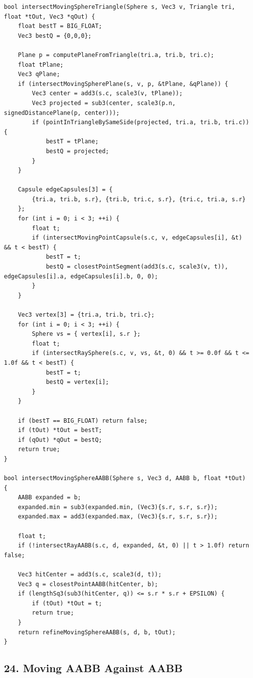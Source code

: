 \documentclass[10pt,letterpaper]{article}
\begin{document}
\begin{verbatim}
bool intersectMovingSphereTriangle(Sphere s, Vec3 v, Triangle tri, float *tOut, Vec3 *qOut) {
    float bestT = BIG_FLOAT;
    Vec3 bestQ = {0,0,0};

    Plane p = computePlaneFromTriangle(tri.a, tri.b, tri.c);
    float tPlane;
    Vec3 qPlane;
    if (intersectMovingSpherePlane(s, v, p, &tPlane, &qPlane)) {
        Vec3 center = add3(s.c, scale3(v, tPlane));
        Vec3 projected = sub3(center, scale3(p.n, signedDistancePlane(p, center)));
        if (pointInTriangleBySameSide(projected, tri.a, tri.b, tri.c)) {
            bestT = tPlane;
            bestQ = projected;
        }
    }

    Capsule edgeCapsules[3] = {
        {tri.a, tri.b, s.r}, {tri.b, tri.c, s.r}, {tri.c, tri.a, s.r}
    };
    for (int i = 0; i < 3; ++i) {
        float t;
        if (intersectMovingPointCapsule(s.c, v, edgeCapsules[i], &t) && t < bestT) {
            bestT = t;
            bestQ = closestPointSegment(add3(s.c, scale3(v, t)), edgeCapsules[i].a, edgeCapsules[i].b, 0, 0);
        }
    }

    Vec3 vertex[3] = {tri.a, tri.b, tri.c};
    for (int i = 0; i < 3; ++i) {
        Sphere vs = { vertex[i], s.r };
        float t;
        if (intersectRaySphere(s.c, v, vs, &t, 0) && t >= 0.0f && t <= 1.0f && t < bestT) {
            bestT = t;
            bestQ = vertex[i];
        }
    }

    if (bestT == BIG_FLOAT) return false;
    if (tOut) *tOut = bestT;
    if (qOut) *qOut = bestQ;
    return true;
}

bool intersectMovingSphereAABB(Sphere s, Vec3 d, AABB b, float *tOut) {
    AABB expanded = b;
    expanded.min = sub3(expanded.min, (Vec3){s.r, s.r, s.r});
    expanded.max = add3(expanded.max, (Vec3){s.r, s.r, s.r});

    float t;
    if (!intersectRayAABB(s.c, d, expanded, &t, 0) || t > 1.0f) return false;

    Vec3 hitCenter = add3(s.c, scale3(d, t));
    Vec3 q = closestPointAABB(hitCenter, b);
    if (lengthSq3(sub3(hitCenter, q)) <= s.r * s.r + EPSILON) {
        if (tOut) *tOut = t;
        return true;
    }
    return refineMovingSphereAABB(s, d, b, tOut);
}
\end{verbatim}


\subsection*{24. Moving AABB Against AABB}
\end{document}
